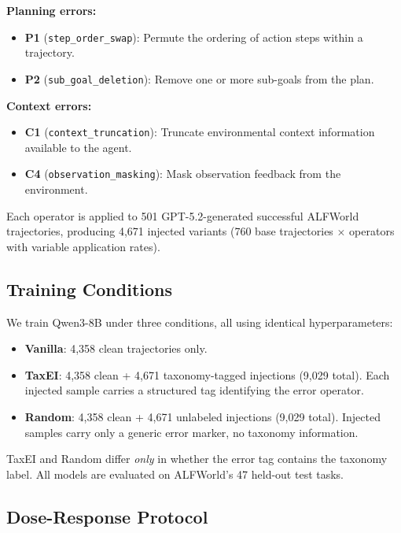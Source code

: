 \documentclass[11pt,a4paper]{article}
\begin{document}
\noindent\textbf{Planning errors:}
\begin{itemize}
\item \textbf{P1} (\texttt{step\_order\_swap}): Permute the ordering of action steps within a trajectory.
\item \textbf{P2} (\texttt{sub\_goal\_deletion}): Remove one or more sub-goals from the plan.
\end{itemize}

\noindent\textbf{Context errors:}
\begin{itemize}
\item \textbf{C1} (\texttt{context\_truncation}): Truncate environmental context information available to the agent.
\item \textbf{C4} (\texttt{observation\_masking}): Mask observation feedback from the environment.
\end{itemize}

Each operator is applied to 501 GPT-5.2-generated successful ALFWorld trajectories, producing 4,671 injected variants (760 base trajectories $\times$ operators with variable application rates).

\subsection{Training Conditions}

We train Qwen3-8B under three conditions, all using identical hyperparameters:

\begin{itemize}
\item \textbf{Vanilla}: 4,358 clean trajectories only.
\item \textbf{TaxEI}: 4,358 clean + 4,671 taxonomy-tagged injections (9,029 total). Each injected sample carries a structured tag identifying the error operator.
\item \textbf{Random}: 4,358 clean + 4,671 unlabeled injections (9,029 total). Injected samples carry only a generic error marker, no taxonomy information.
\end{itemize}

TaxEI and Random differ \emph{only} in whether the error tag contains the taxonomy label. All models are evaluated on ALFWorld's 47 held-out test tasks.

\subsection{Dose-Response Protocol}
\end{document}
